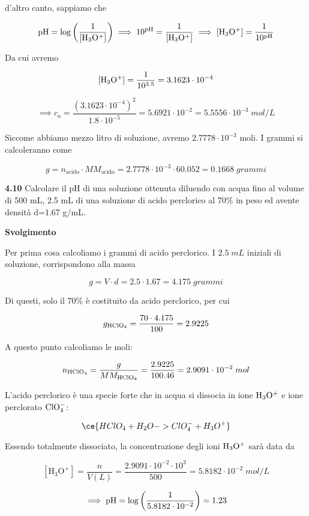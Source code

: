 d'altro canto, sappiamo che

$$\rm pH=\log{\left(\frac{1}{[H_3O^+]}\right)}
\implies
10^{pH}=\frac{1}{[H_3O^+]}
\implies
[H_3O^+]=\frac{1}{10^{pH}}$$

Da cui avremo

$$\rm [H_3O^+]=\frac{1}{10^{3.5}}=3.1623 \cdot 10^{-4}$$

$$\implies
c_a=\frac{(3.1623 \cdot 10^{-4})^2}{1.8 \cdot 10^{-5}}=5.6921 \cdot 10^{-2}
=5.5556 \cdot 10^{-3}\;mol/L$$

Siccome abbiamo mezzo litro di soluzione, avremo $2.7778 \cdot 10^{-3}$ moli. I grammi si calcoleranno come

$$g=n_{\text{acido}} \cdot MM_{\text{acido}}
=2.7778 \cdot 10^{-3} \cdot 60.052=0.1668\;grammi$$

\vspace{0.2cm}\textbf{4.10} Calcolare il pH di una soluzione ottenuta diluendo con acqua fino al volume di 500 mL, 2.5 mL
di una soluzione di acido perclorico al 70\% in peso ed avente densità d=1.67 g/mL.

\vspace{0.2cm}\large\textbf{Svolgimento}\normalsize

\vspace{0.2cm}Per prima cosa calcoliamo i grammi di acido perclorico. I $2.5\;mL$ iniziali di soluzione, corrispondono alla massa

$$g=V \cdot d=2.5 \cdot 1.67=4.175\;grammi$$

Di questi, solo il 70\% è costituito da acido perclorico, per cui

$$g_{\rm HClO_4}=\frac{70 \cdot 4.175}{100}=2.9225$$

A questo punto calcoliamo le moli:

$$n_{\rm HClO_4}
=\frac{g}{MM_{\rm HClO_4}}
=\frac{2.9225}{100.46}=2.9091 \cdot 10^{-2}\;mol$$

L'acido perclorico è una specie forte che in acqua si dissocia in ione $\rm H_3O^+$ e ione perclorato $\rm ClO_4^-$:

$$\ce{HClO_4 + H_2O -> ClO_4^- + H_3O^+}$$

Essendo totalmente dissociato, la concentrazione degli ioni $\rm H_3O^+$ sarà data da

$$[\text{H}_3\text{O}^+]=\frac{n}{V(L)}=\frac{2.9091 \cdot 10^{-2} \cdot 10^{3}}{500}=5.8182 \cdot 10^{-2}\;mol/L$$

$$\implies \rm pH=\log{\left( \frac{1}{5.8182 \cdot 10^{-2}} \right)}=1.23$$

